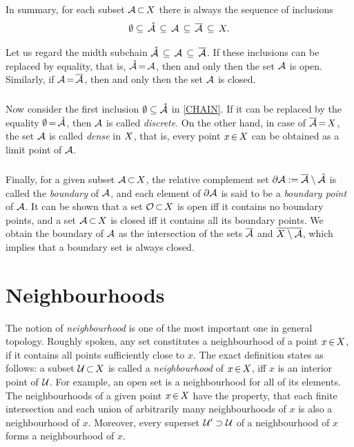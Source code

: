 \documentclass[11pt,twoside]{article}
\begin{document}
In summary,
for each subset $\mathcal{A} {\,\subset\,} X$ there is always
the sequence of inclusions
\begin{equation}\label{CHAIN}
\emptyset
\subseteq \, \mathring{\mathcal{A}} \,
\subseteq \, \mathcal{A}            \,
\subseteq \, \overline{\mathcal{A}} \,
\subseteq \, X.
\end{equation}

Let us regard the midth subchain
$\mathring{\mathcal{A}} \, \subseteq \, \mathcal{A} \, \subseteq \, \overline{\mathcal{A}}$.
If these inclusions can be replaced by equality,
that is,
$\mathring{\mathcal{A}} {\,=\,} \mathcal{A}$,
then and only then the set $\mathcal{A}$ is open.
Similarly,
if $\mathcal{A} {\,=\,} \overline{\mathcal{A}}$,
then and only then the set $\mathcal{A}$ is closed.

\subparagraph{} %
Now consider the first inclusion $\emptyset \subseteq \mathring{\mathcal{A}}$
in \eqref{CHAIN}.
If it can be replaced by the equality $\emptyset {\,=\,} \mathring{\mathcal{A}}$,
then $\mathcal{A}$ is called \textit{discrete}.
On the other hand,
in case of $\overline{\mathcal{A}} {\,=\,} X$,
the set $\mathcal{A}$ is called \textit{dense} in $X$,
that is,
every point $x {\,\in\,} X$ can be obtained as a limit point of $\mathcal{A}$.

\subparagraph{} %
Finally,
for a given subset $\mathcal{A} {\,\subset\,} X$,
the relative complement set
$\partial \mathcal{A} := \overline{\mathcal{A}} \setminus \mathring{\mathcal{A}}$
is called the \textit{boundary} of $\mathcal{A}$,
and each element of $\partial \mathcal{A}$ is said
to be a \textit{boundary point} of $\mathcal{A}$.
It can be shown
that a set $\mathcal{O} {\,\subset\,} X$ is open
iff it contains no boundary points,
and a set $\mathcal{A} {\,\subset\,} X$ is closed
iff it contains all its boundary points.
We obtain the boundary of $\mathcal{A}$ as the intersection
of the sets $\overline{\mathcal{A}}$ and $\overline{X \setminus \mathcal{A}}$,
which implies that a boundary set is always closed.

\section{Neighbourhoods}                                                       %
The notion of \textit{neighbourhood} is one of
the most important one in general topology.
Roughly spoken,
any set constitutes a neighbourhood of a point $x {\,\in\,} X$,
if it contains all points sufficiently close to $x$.
The exact definition states as follows:
a subset $\mathcal{U} {\,\subset\,} X$ is called a \textit{neighbourhood}
of $x {\,\in\,} X$,
iff $x$ is an interior point of $\mathcal{U}$.
For example,
an open set is a neighbourhood for all of its elements.
The neighbourhoods of a given point $x {\,\in\,} X$ have the property,
that each finite intersection and each union of arbitrarily many
neighbourhoods of $x$ is also a neighbourhood of $x$.
Moreover,
every superset $\mathcal{U}' \supset \mathcal{U}$ of a neighbourhood of $x$
forms a neighbourhood of $x$.
\end{document}
